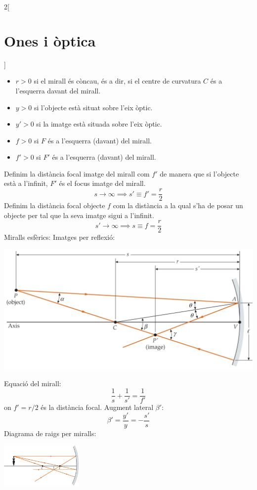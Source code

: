 \documentclass[../../../main.tex]{subfiles}
\begin{document}
\begin{multicols}{2}[\section{Ones i òptica}]
\begin{itemize}
    \item $r>0$ si el mirall és còncau, és a dir, si el centre de curvatura $C$ és a l'esquerra davant del mirall.
    \item $y>0$ si l'objecte està situat sobre l'eix òptic.
    \item $y'>0$ si la imatge està situada sobre l'eix òptic.
    \item $f>0$ si $F$ és a l'esquerra (davant) del mirall.
    \item $f'>0$ si $F'$ és a l'esquerra (davant) del mirall.
\end{itemize}
Definim la distància focal imatge del mirall com $f'$ de manera que si l'objecte està a l'infinit, $F'$ és el focus imatge del mirall. $$s\to\infty\implies s'\equiv f'=\frac{r}{2}$$ Definim la distància focal objecte $f$ com la distància a la qual s'ha de posar un objecte per tal que la seva imatge sigui a l'infinit. $$s'\to\infty\implies s\equiv f=\frac{r}{2}$$
Miralls esfèrics:\newline
Imatges per reflexió:\newline
\begin{minipage}{\linewidth}
    \centering
    \includegraphics[width=\linewidth]{Physics/1st/Waves_and_optics/Images/conc.jpg} 
\end{minipage}
Equació del mirall:
$$\frac{1}{s}+\frac{1}{s'}=\frac{1}{f'}$$ {\footnotesize on $f'=r/2$ és la distància focal.}\newline 
Augment lateral $\beta'$:
$$\beta'=\frac{y'}{y}=-\frac{s'}{s}$$
Diagrama de raigs per miralls:\newline
\begin{minipage}{\linewidth}
    \centering
    \includegraphics[width=4cm]{Physics/1st/Waves_and_optics/Images/raigs.jpg} 

\end{minipage}
\end{multicols}
\end{document}
